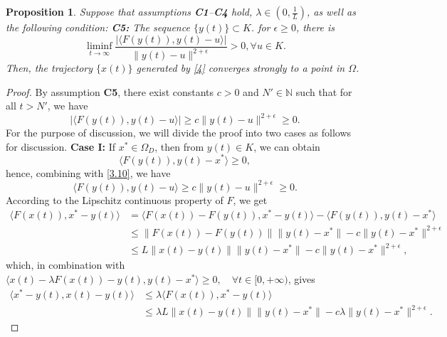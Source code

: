 \documentclass[hidelinks,11 pt]{article}
\numberwithin{equation}{section}
\newtheorem{proposition}[theorem]{Proposition}
\theoremstyle{definition}  %
\numberwithin{equation}{section}
\numberwithin{theorem}{section}
\begin{document}
\begin{proposition}\label{p3.9}
    Suppose that assumptions \textbf{C1}–\textbf{C4} hold, $\lambda\in(0,\frac{1}{L})$, as well as the following condition:
\vskip 2mm 
\textbf{C5:} The sequence $\{y(t)\}\subset K$. for $\epsilon\geq0$, there is 
\begin{equation*}
   \liminf_{t\to\infty}\frac{\vert \langle F(y(t)),y(t)-u\rangle\vert}{\|y(t)-u\|^{2+\epsilon}}>0, \forall u\in K.  
\end{equation*}
\vskip 2mm 
Then, the trajectory $\{x(t)\}$ generated by \eqref{4} converges strongly to a point in $\Omega$.
\end{proposition}
\begin{proof}
    By assumption \textbf{C5}, there exist constants $c>0$ and $N'\in\mathbb{N}$ such that for all $t > N'$, we have
    \begin{equation*}\label{3.10}
        \vert \langle F(y(t)),y(t)-u\rangle\vert\geq c\|y(t)-u\|^{2+\epsilon}\geq 0. \tag{3.10}
    \end{equation*}
For the purpose of discussion, we will divide the proof into two cases as follows for
discussion.
\vskip 2mm 
\textbf{Case I:} If $x^*\in \Omega_{D} $, then from $y(t)\in K$, we can obtain 
\begin{equation*}
    \langle F(y(t)), y(t)-x^*\rangle\geq 0, 
\end{equation*}
hence, combining with \eqref{3.10}, we have 
\begin{equation*}
     \langle F(y(t)),y(t)-u\rangle\geq c\|y(t)-u\|^{2+\epsilon}\geq 0.
\end{equation*}
According to the Lipschitz continuous property of $F$, we get 
\begin{align*}
     \langle F(x(t)),x^*-y(t)\rangle& =  \langle F(x(t))-F(y(t)),x^*-y(t)\rangle- \langle F(y(t)),y(t)-x^*\rangle\\
     &\leq \| F(x(t))-F(y(t))\|\|y(t)-x^*\|-c\|y(t)-x^*\|^{2+\epsilon}\\
     &\leq L\|x(t)-y(t)\|\|y(t)-x^*\|-c\|y(t)-x^*\|^{2+\epsilon}, 
\end{align*}
which, in combination with $ \langle x(t) - \lambda F(x(t)) - y(t), y(t) - x^* \rangle \geq 0, \quad \forall t \in [0, +\infty)$, gives 
\begin{align*}
    \langle x^*-y(t),x(t)-y(t)\rangle&\leq \lambda\langle F(x(t)), x^*-y(t)\rangle\\
    &\leq \lambda L\|x(t)-y(t)\|\|y(t)-x^*\|-c\lambda\|y(t)-x^*\|^{2+\epsilon}. 
\end{align*}

\end{proof}
\end{document}
